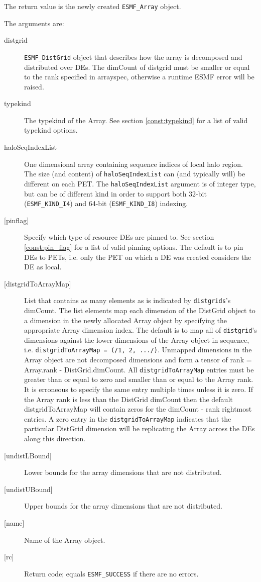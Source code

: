    The return value is the newly created {\tt ESMF\_Array} object.
  
   The arguments are:
   \begin{description}
   \item[distgrid]
   {\tt ESMF\_DistGrid} object that describes how the array is decomposed and
   distributed over DEs. The dimCount of distgrid must be smaller or equal
   to the rank specified in arrayspec, otherwise a runtime ESMF error will be
   raised.
   \item[typekind]
   The typekind of the Array. See section \ref{const:typekind}
   for a list of valid typekind options.
   \item[haloSeqIndexList]
   One dimensional array containing sequence indices of local halo region.
   The size (and content) of {\tt haloSeqIndexList} can (and typically will)
   be different on each PET.
   The {\tt haloSeqIndexList} argument is of integer type, but can be of
   different kind in order to support both 32-bit ({\tt ESMF\_KIND\_I4})
   and 64-bit ({\tt ESMF\_KIND\_I8}) indexing.
   \item[{[pinflag]}]
   Specify which type of resource DEs are pinned to. See section
   \ref{const:pin_flag} for a list of valid pinning options.
   The default is to pin DEs to PETs, i.e. only the PET on which a DE
   was created considers the DE as local.
   \item[{[distgridToArrayMap]}]
   List that contains as many elements as is indicated by
   {\tt distgrids}'s dimCount. The list elements map each dimension of
   the DistGrid object to a dimension in the newly allocated Array object
   by specifying the appropriate Array dimension index. The default is
   to map all of {\tt distgrid}'s dimensions against the lower dimensions
   of the Array object in sequence, i.e. {\tt distgridToArrayMap =
   (/1, 2, .../)}.
   Unmapped dimensions in the Array object are not decomposed dimensions
   and form a tensor of rank = Array.rank - DistGrid.dimCount.
   All {\tt distgridToArrayMap} entries must be greater than or equal
   to zero and smaller than or equal to the Array rank. It is erroneous
   to specify the same entry multiple times unless it is zero.
   If the Array rank is less than the DistGrid dimCount then the default
   distgridToArrayMap will contain zeros for the dimCount - rank
   rightmost entries. A zero entry in the {\tt distgridToArrayMap}
   indicates that the particular DistGrid dimension will be replicating
   the Array across the DEs along this direction.
   \item[{[undistLBound]}]
   Lower bounds for the array dimensions that are not distributed.
   \item[{[undistUBound]}]
   Upper bounds for the array dimensions that are not distributed.
   \item[{[name]}]
   Name of the Array object.
   \item[{[rc]}]
   Return code; equals {\tt ESMF\_SUCCESS} if there are no errors.
   \end{description}
   
